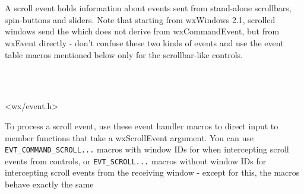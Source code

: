 \section{}\label{wxscrollevent}

A scroll event holds information about events sent from stand-alone
scrollbars, spin-buttons and sliders. Note that starting from wxWindows 2.1,
scrolled windows send the  which
does not derive from wxCommandEvent, but from wxEvent directly - don't confuse
these two kinds of events and use the event table macros mentioned below only
for the scrollbar-like controls.


\\
\\


<wx/event.h>


To process a scroll event, use these event handler macros to direct input to
member functions that take a wxScrollEvent argument. You can use
{\tt EVT\_COMMAND\_SCROLL...} macros with window IDs for when intercepting
scroll events from controls, or {\tt EVT\_SCROLL...} macros without window IDs
for intercepting scroll events from the receiving window - except for this,
the macros behave exactly the same

